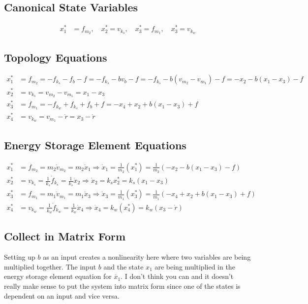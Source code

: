 \documentclass{article}
\begin{document}
\subsection{Canonical State Variables}
\begin{align*}
x^*_1 &= f_{m_2}, \quad x^*_2 = v_{k_s}, \quad x^*_3 = f_{m_1}, \quad x^*_3 = v_{k_w}
\end{align*}

\subsection{Topology Equations}
\begin{align*}
x^*_1 &= f_{m_2} = -f_{k_s} - f_b - f = -f_{k_s} - bv_b - f = -f_{k_s} - b(v_{m_2} - v_{m_1}) - f = -x_2 - b(x_1 - x_3)  - f \\
x^*_2 &= v_{k_s} = v_{m_2} - v_{m_1} = x_1 - x_3 \\
x^*_3 &= f_{m_1} = -f_{k_w} + f_{k_s} + f_b + f = -x_4 + x_2 + b(x_1 - x_3) + f\\
x^*_4 &= v_{k_w} = v_{m_1} - \dot{r} = x_3 - \dot{r}
\end{align*}

\subsection{Energy Storage Element Equations}
\begin{align*}
x^*_1 &= f_{m_2} = m_2 \dot{v}_{m_2} = m_2 \dot{x}_1 \Rightarrow \dot{x}_1 = \frac{1}{m_2} (x_1^*) = \frac{1}{m_2} (-x_2 - b(x_1-x_3) - f) \\
x^*_2 &= v_{k_s} = \frac{1}{k_s} \dot{f}_{k_s} = \frac{1}{k_s} \dot{x}_2 \Rightarrow \dot{x}_2 = k_s x^*_2 = k_s (x_1 - x_3) \\
x^*_3 &= f_{m_1} = m_1 \dot{v}_{m_1} = m_1 \dot{x}_3 \Rightarrow \dot{x}_3 = \frac{1}{m_1} (x_3^*) = \frac{1}{m_1} (-x_4 + x_2 + b(x_1 - x_3) + f) \\
x^*_4 &= v_{k_w} = \frac{1}{k_w} \dot{f}_{k_w} = \frac{1}{k_w} \dot{x}_4 \Rightarrow \dot{x}_4 = k_w(x^*_4) = k_w (x_3 - \dot{r})
\end{align*}

\subsection{Collect in Matrix Form}

Setting up $b$ as an input creates a nonlinearity here where two variables are being multiplied together.
The input $b$ and the state $x_1$ are being multiplied in the energy storage element equation for $\dot{x_1}$.
I don't think you can and it doesn't really make sense to put the system into matrix form since one of the states is dependent on an input and vice versa.
\end{document}
